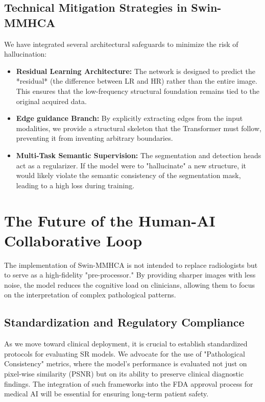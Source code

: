 \subsection{Technical Mitigation Strategies in Swin-MMHCA}
We have integrated several architectural safeguards to minimize the risk of hallucination:
\begin{itemize}
    \item \textbf{Residual Learning Architecture:} The network is designed to predict the *residual* (the difference between LR and HR) rather than the entire image. This ensures that the low-frequency structural foundation remains tied to the original acquired data.
    \item \textbf{Edge guidance Branch:} By explicitly extracting edges from the input modalities, we provide a structural skeleton that the Transformer must follow, preventing it from inventing arbitrary boundaries.
    \item \textbf{Multi-Task Semantic Supervision:} The segmentation and detection heads act as a regularizer. If the model were to "hallucinate" a new structure, it would likely violate the semantic consistency of the segmentation mask, leading to a high loss during training.
\end{itemize}

\section{The Future of the Human-AI Collaborative Loop}
The implementation of Swin-MMHCA is not intended to replace radiologists but to serve as a high-fidelity "pre-processor." By providing sharper images with less noise, the model reduces the cognitive load on clinicians, allowing them to focus on the interpretation of complex pathological patterns. 

\subsection{Standardization and Regulatory Compliance}
As we move toward clinical deployment, it is crucial to establish standardized protocols for evaluating SR models. We advocate for the use of "Pathological Consistency" metrics, where the model's performance is evaluated not just on pixel-wise similarity (PSNR) but on its ability to preserve clinical diagnostic findings. The integration of such frameworks into the FDA approval process for medical AI will be essential for ensuring long-term patient safety.
